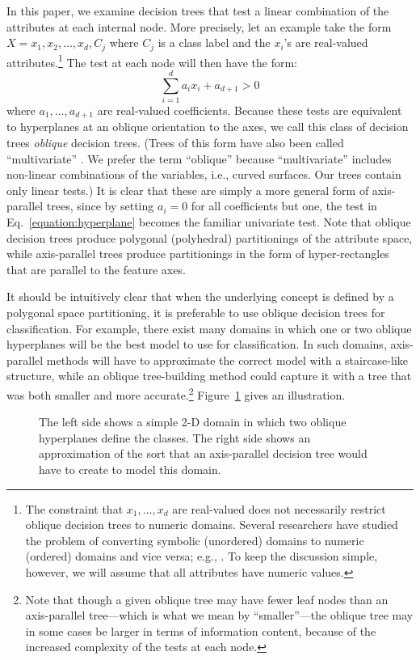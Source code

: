 In this paper, we examine decision trees that test a linear
combination of the attributes at each internal node.  More precisely,
let an example take the form $X = x_1,x_2,\ldots,x_d,C_j$ where $C_j$
is a class label and the $x_i$'s are real-valued
attributes.\footnote{The constraint that $x_1,\ldots,x_d$ are
real-valued does not necessarily restrict oblique decision trees to
numeric domains.  Several researchers have studied the problem of
converting symbolic (unordered) domains to numeric (ordered) domains
and vice versa; e.g., \cite{breiman/etal/84,hampson/volper/86,%
utgoff/brodley/90,deMerckt/92,deMerckt/93}.  To keep the discussion
simple, however, we will assume that all attributes have numeric
values.} The test at each node will then have the form:
\begin{equation}
\label{equation:hyperplane}
 \sum_{i=1}^{d}{a_ix_i} + a_{d+1} > 0  
\end{equation}
where $a_1,\ldots,a_{d+1}$ are real-valued coefficients.  Because
these tests are equivalent to hyperplanes at an oblique orientation to
the axes, we call this class of decision trees {\em oblique} decision
trees.  (Trees of this form have also been called ``multivariate''
\cite{brodley/utgoff/94}.  We prefer the term ``oblique'' because
``multivariate'' includes non-linear combinations of the variables,
i.e., curved surfaces.  Our trees contain only linear tests.)  It is
clear that these are simply a more general form of axis-parallel
trees, since by setting $a_i = 0$ for all coefficients but one, the
test in Eq.~\ref{equation:hyperplane} becomes the familiar univariate
test.  Note that oblique decision trees produce polygonal (polyhedral)
partitionings of the attribute space, while axis-parallel trees
produce partitionings in the form of hyper-rectangles that are
parallel to the feature axes.

It should be intuitively clear that when the underlying concept is
defined by a polygonal space partitioning, it is preferable to use
oblique decision trees for classification.  For example, there exist
many domains in which one or two oblique hyperplanes will be the best
model to use for classification.  In such domains, axis-parallel
methods will have to approximate the correct model with a
staircase-like structure, while an oblique tree-building method could
capture it with a tree that was both smaller and more
accurate.\footnote{Note that though a given oblique tree may have fewer
leaf nodes than an axis-parallel tree---which is what we mean by
``smaller''---the oblique tree may in some cases be larger in terms of
information content, because of the increased complexity of the tests
at each node.}  Figure~\ref{figure:stairs} gives an illustration.
\begin{figure}
\vspace{2.0in}
\caption{The left side shows a simple 2-D domain in which two oblique 
hyperplanes define the classes.  The right side shows an approximation of
the sort that an axis-parallel decision tree would have to create to model
this domain.}
\label{figure:stairs}
\vspace*{-.2in} 
\end{figure}

